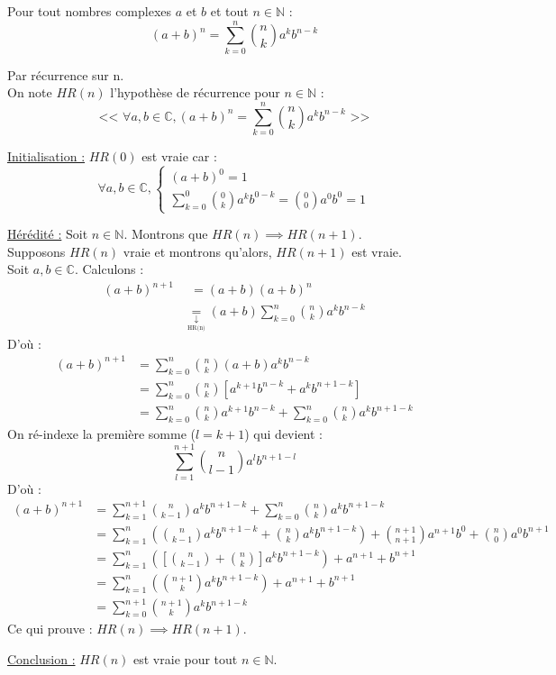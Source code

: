 \documentclass[a4paper,11pt]{article}
\newcommand{\N}{\mathbb{N}}
\newcommand{\C}{\mathbb{C}}
\newcommand{\equalwithtext}[1]{\underset{\underset{\text{#1}}{\downarrow}}{=}}
\begin{document}
\newpage

\begin{proposition}
	Pour tout nombres complexes $a$ et $b$ et tout $n\in\N$ :
	$$(a+b)^n = \sum_{k=0}^{n}\binom{n}{k}a^kb^{n-k}$$
\end{proposition}

\begin{demonstration}
	Par récurrence sur n. \\
	On note $HR(n)$ l'hypothèse de récurrence pour $n\in\N$ :
	$$\text{<< }\forall a,b\in\C, (a+b)^n = \sum_{k=0}^{n}\binom{n}{k}a^kb^{n-k}\text{ >>}$$
	
	\underline{Initialisation :} $HR(0)$ est vraie car :
	$$\forall a,b\in\C,
	\begin{cases}
		(a+b)^0 = 1 \\
		\sum_{k=0}^{0}\binom{0}{k}a^kb^{0-k} = \binom{0}{0}	a^0b^0 = 1
	\end{cases}$$
	
	\underline{Hérédité :} Soit $n\in\N$. Montrons que $HR(n) \implies HR(n+1)$.\\
	Supposons $HR(n)$ vraie et montrons qu'alors, $HR(n+1)$ est vraie. \\
	Soit $a, b \in\C$. Calculons :
	\begin{align*}
		(a+b)^{n+1} & \;\:= (a+b)(a+b)^n \\
		&\equalwithtext{HR(n)} (a+b)\sum_{k=0}^{n}\binom{n}{k}a^kb^{n-k}
	\end{align*}
	D'où :
	\begin{align*}
		(a+b)^{n+1} &= \sum_{k=0}^{n}\binom{n}{k}(a+b)a^kb^{n-k} \\
		&= \sum_{k=0}^{n}\binom{n}{k}[a^{k+1}b^{n-k} + a^kb^{n+1-k}] \\
		&= \sum_{k=0}^{n}\binom{n}{k}a^{k+1}b^{n-k} + \sum_{k=0}^{n}\binom{n}{k}a^kb^{n+1-k}
	\end{align*}
	On ré-indexe la première somme ($l = k+1$) qui devient : $$\sum_{l=1}^{n+1}\binom{n}{l-1}a^lb^{n+1-l}$$
	D'où :
	\begin{align*}
		(a+b)^{n+1} &= \sum_{k=1}^{n+1}\binom{n}{k-1}a^kb^{n+1-k} + \sum_{k=0}^{n}\binom{n}{k}a^kb^{n+1-k} \\
		&= \sum_{k=1}^{n}(\binom{n}{k-1}a^kb^{n+1-k} + \binom{n}{k}a^kb^{n+1-k}) + \binom{n+1}{n+1}a^{n+1}b^0 + \binom{n}{0}a^0b^{n+1} \\
		&= \sum_{k=1}^{n}([\binom{n}{k-1} + \binom{n}{k}]a^kb^{n+1-k}) + a^{n+1} + b^{n+1} \\
		&= \sum_{k=1}^{n}(\binom{n+1}{k}a^kb^{n+1-k}) + a^{n+1} + b^{n+1} \\
		&= \sum_{k=0}^{n+1}\binom{n+1}{k}a^kb^{n+1-k}
	\end{align*}
	Ce qui prouve : $HR(n) \implies HR(n+1)$.
	
	\underline{Conclusion :} $HR(n)$ est vraie pour tout $n\in\N$.
\end{demonstration}
\end{document}
